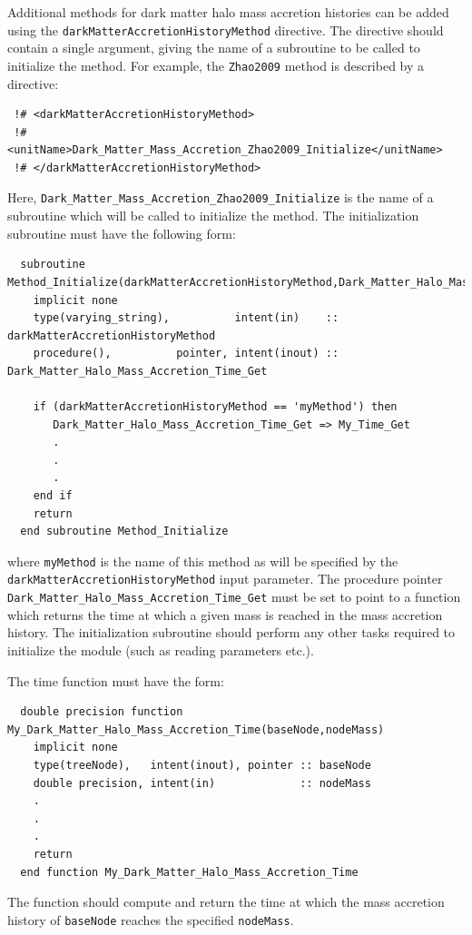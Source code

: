 Additional methods for dark matter halo mass accretion histories can be added using the {\tt darkMatterAccretionHistoryMethod} directive. The directive should contain a single argument, giving the name of a subroutine to be called to initialize the method. For example, the {\tt Zhao2009} method is described by a directive:
\begin{verbatim}
 !# <darkMatterAccretionHistoryMethod>
 !#  <unitName>Dark_Matter_Mass_Accretion_Zhao2009_Initialize</unitName>
 !# </darkMatterAccretionHistoryMethod>
\end{verbatim}
Here, {\tt Dark\_Matter\_Mass\_Accretion\_Zhao2009\_Initialize} is the name of a subroutine which will be called to initialize the method. The initialization subroutine must have the following form:
\begin{verbatim}
  subroutine Method_Initialize(darkMatterAccretionHistoryMethod,Dark_Matter_Halo_Mass_Accretion_Time_Get)
    implicit none
    type(varying_string),          intent(in)    :: darkMatterAccretionHistoryMethod
    procedure(),          pointer, intent(inout) :: Dark_Matter_Halo_Mass_Accretion_Time_Get
    
    if (darkMatterAccretionHistoryMethod == 'myMethod') then
       Dark_Matter_Halo_Mass_Accretion_Time_Get => My_Time_Get
       .
       .
       .
    end if
    return
  end subroutine Method_Initialize
\end{verbatim}
where {\tt myMethod} is the name of this method as will be specified by the {\tt darkMatterAccretionHistoryMethod} input parameter. The procedure pointer {\tt Dark\_Matter\_Halo\_Mass\_Accretion\_Time\_Get} must be set to point to a function which returns the time at which a given mass is reached in the mass accretion history. The initialization subroutine should perform any other tasks required to initialize the module (such as reading parameters etc.).

The time function must have the form:
\begin{verbatim}
  double precision function My_Dark_Matter_Halo_Mass_Accretion_Time(baseNode,nodeMass)
    implicit none
    type(treeNode),   intent(inout), pointer :: baseNode
    double precision, intent(in)             :: nodeMass
    .
    .
    .
    return
  end function My_Dark_Matter_Halo_Mass_Accretion_Time
\end{verbatim}
The function should compute and return the time at which the mass accretion history of {\tt baseNode} reaches the specified {\tt nodeMass}.

